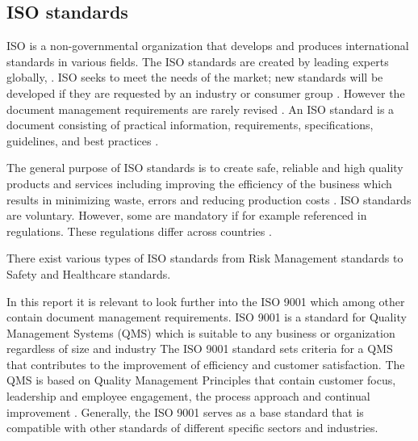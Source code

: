 \subsection{ISO standards} \label{sec:ISOstandards}
ISO is a non-governmental organization that develops and produces international standards in various fields.
The ISO standards are created by leading experts globally, %
\cite{ISOinfo}.
ISO seeks to meet the needs of the market; new standards will be developed if they are requested by an industry or consumer group \cite{ISOdeveloping}.
However the document management requirements are rarely revised \cite{Ipsenfirstinterview}.
An ISO standard is a document consisting of practical information, requirements, specifications, guidelines, and best practices \cite{ISOreviewedevery5years}.

The general purpose of ISO standards is to create safe, reliable and high quality products and services including improving the efficiency of the business which results in minimizing waste, errors and reducing production costs \cite{ISOinfo}. %
ISO standards are voluntary.
However, some are mandatory if for example referenced in regulations.
These regulations differ across countries \cite{ISOreviewedevery5years}.

There exist various types of ISO standards from Risk Management standards to Safety and Healthcare standards. 


In this report it is relevant to look further into the ISO 9001 which among other contain document management requirements.
ISO 9001 is a standard for Quality Management Systems (QMS) which is suitable to any business or organization regardless of size and industry \cite{ISO9001}
The ISO 9001 standard sets criteria for a QMS that contributes to the improvement of efficiency and customer satisfaction.
The QMS is based on Quality Management Principles that contain customer focus, leadership and employee engagement, the process approach and continual improvement \cite{ISO9001-2}.
Generally, the ISO 9001 serves as a base standard that is compatible with other standards of different specific sectors and industries.

